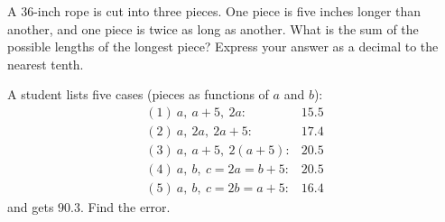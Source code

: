 A $36$-inch rope is cut into three pieces. One piece is five inches longer than another, and one piece is twice as long as another. What is the sum of the possible lengths of the longest piece? Express your answer as a decimal to the nearest tenth.

A student lists five cases (pieces as functions of $a$ and $b$):
\[
\begin{array}{ll}
(1)\ a,\ a+5,\ 2a: & 15.5\\
(2)\ a,\ 2a,\ 2a+5: & 17.4\\
(3)\ a,\ a+5,\ 2(a+5): & 20.5\\
(4)\ a,\ b,\ c=2a=b+5: & 20.5\\
(5)\ a,\ b,\ c=2b=a+5: & 16.4
\end{array}
\]
and gets $90.3$. Find the error.
